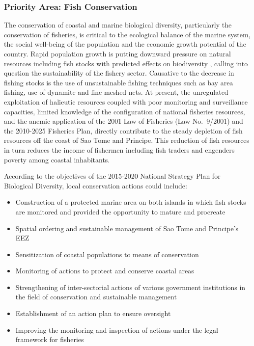 \documentclass[
]{book}
\providecommand{\tightlist}{%
  \setlength{\itemsep}{0pt}\setlength{\parskip}{0pt}}
\begin{document}
\hypertarget{priority-area-fish-conservation}{%
\subsubsection{Priority Area: Fish Conservation}\label{priority-area-fish-conservation}}

The conservation of coastal and marine biological diversity, particularly the conservation of fisheries, is critical to the ecological balance of the marine system, the social well-being of the population and the economic growth potential of the country. Rapid population growth is putting downward pressure on natural resources including fish stocks with predicted effects on biodiversity , calling into question the sustainability of the fishery sector. Causative to the decrease in fishing stocks is the use of unsustainable fishing techniques such as bay area fishing, use of dynamite and fine-meshed nets. At present, the unregulated exploitation of halieutic resources coupled with poor monitoring and surveillance capacities, limited knowledge of the configuration of national fisheries resources, and the anemic application of the 2001 Law of Fisheries (Law No.~9/2001) and the 2010-2025 Fisheries Plan, directly contribute to the steady depletion of fish resources off the coast of Sao Tome and Principe. This reduction of fish resources in turn reduces the income of fishermen including fish traders and engenders poverty among coastal inhabitants.

According to the objectives of the 2015-2020 National Strategy Plan for Biological Diversity, local conservation actions could include:

\begin{itemize}
\tightlist
\item
  Construction of a protected marine area on both islands in which fish stocks are monitored and provided the opportunity to mature and procreate
\item
  Spatial ordering and sustainable management of Sao Tome and Principe's EEZ
\item
  Sensitization of coastal populations to means of conservation
\item
  Monitoring of actions to protect and conserve coastal areas
\item
  Strengthening of inter-sectorial actions of various government institutions in the field of conservation and sustainable management
\item
  Establishment of an action plan to ensure oversight
\item
  Improving the monitoring and inspection of actions under the legal framework for fisheries
\end{itemize}
\end{document}

